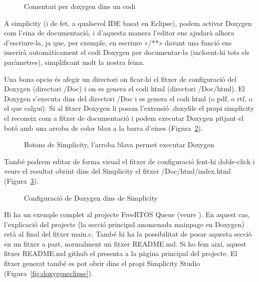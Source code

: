\begin{figure}
 \centering
 \caption{Comentari per doxygen dins un codi}
 \label{fig:doxygencode}
\end{figure}

A simplicity (i de fet, a qualsevol IDE basat en Eclipse), podem activar Doxygen com l'eina de documentació, i d'aquesta manera l'editor ens ajudarà alhora d'escriure-la, ja que, per exemple, en escriure «/**» davant una funció ens inserirà automàticament el codi Doxygen per documentar-la (incloent-hi tots els paràmetres), simplificant molt la nostra feina.

Una bona opcio és afegir un directori on ficar-hi el fitxer de configuració del Doxygen (directori /Doc) i on es genera el codi html (directori /Doc/html). El Doxygen s'executa dins del directori /Doc i es genera el codi html (o pdf, o rtf, o el que calgui). Si al fitxer Doxygen li posem l'extensió .doxyfile el propi simplicity el reconeix com a fitxer de documentació i podem executar Doxygen pitjant el botó amb una arroba de color blau a la barra d'eines (Figura~\ref{fig:doxygenbutton}).

\begin{figure}[h!]
 \centering
 \caption{Botons de Simplicity, l'arroba blava permet executar Doxygen}
 \label{fig:doxygenbutton}
\end{figure}


També podrem editar de forma visual el fitxer de configuració fent-hi doble-click i veure el resultat obrint dins del Simplicity el fitxer /Doc/html/index.html (Figura~\ref{fig:doxygenconfig}).

\begin{figure}
 \centering
 \caption{Configuració de Doxygen dins de Simplicity}
 \label{fig:doxygenconfig}
\end{figure}

Hi ha un exemple complet al projecte FreeRTOS Queue (veure ). En aquest cas, l'explicació del projecte (la secció principal anomenada mainpage en Doxygen) està al final del fitxer main.c. També hi ha la possibilitat de posar aquesta secció en un fitxer a part, normalment un fitxer README.md. Si ho fem així, aquest fitxer README.md github el presenta a la pàgina principal del projecte. El fitxer generat també es pot obrir dins el propi Simplicity Studio (Figura~\ref{fig:doxygeneclipse}).

